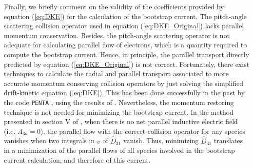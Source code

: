 Finally, we briefly comment on the validity of the coefficients provided by equation (\ref{eq:DKE}) for the calculation of the bootstrap current. The pitch-angle scattering collision operator used in equation (\ref{eq:DKE_Original}) lacks parallel momentum conservation. Besides, the pitch-angle scattering operator is not adequate for calculating parallel flow of electrons, which is a quantity required to compute the bootstrap current. Hence, in principle, the parallel transport directly predicted by equation (\ref{eq:DKE_Original}) is not correct. Fortunately, there exist techniques  \cite{Taguchi,Sugama-PENTA,Sugama2008,MaasbergMomentumCorrection} to calculate the radial and parallel transport associated to more accurate momentum conserving collision operators by just solving the simplified drift-kinetic equation (\ref{eq:DKE}). This has been done successfully in the past by the code \texttt{PENTA} \cite{Sugama-PENTA, Spong-PENTA}, using the results of {\DKES}. Nevertheless, the momentum restoring technique is not needed for minimizing the bootstrap current. In the method presented in section V of \cite{MaasbergMomentumCorrection}, when there is no net parallel inductive electric field (i.e. $A_{3a}=0$), the parallel flow with the correct collision operator for any species vanishes when two integrals in $v$ of $\widehat{D}_{31}$ vanish. Thus, minimizing $\widehat{D}_{31}$ translates in a minimization of the parallel flows of all species involved in the bootstrap current calculation, and therefore of this current.  
%

